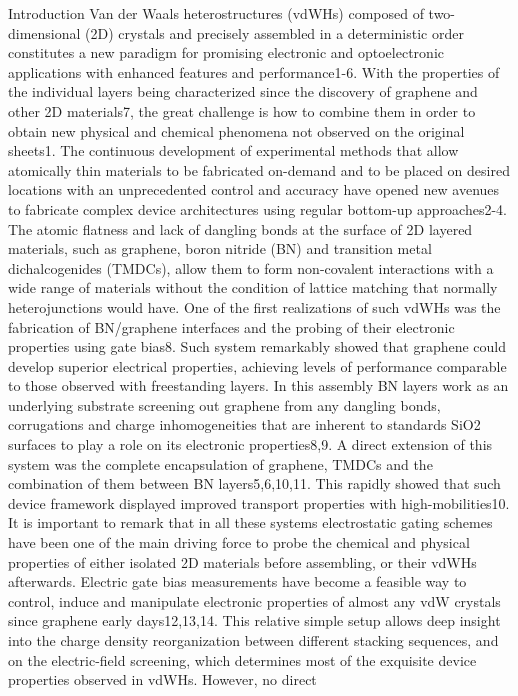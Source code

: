 Introduction Van der Waals heterostructures (vdWHs) composed of
two-dimensional (2D) crystals and precisely assembled in a
deterministic order constitutes a new paradigm for promising
electronic and optoelectronic applications with enhanced features and
performance1-6. With the properties of the individual layers being
characterized since the discovery of graphene and other 2D materials7,
the great challenge is how to combine them in order to obtain new
physical and chemical phenomena not observed on the original
sheets1. The continuous development of experimental methods that allow
atomically thin materials to be fabricated on-demand and to be placed
on desired locations with an unprecedented control and accuracy have
opened new avenues to fabricate complex device architectures using
regular bottom-up approaches2-4. The atomic flatness and lack of
dangling bonds at the surface of 2D layered materials, such as
graphene, boron nitride (BN) and transition metal dichalcogenides
(TMDCs), allow them to form non-covalent interactions with a wide
range of materials without the condition of lattice matching that
normally heterojunctions would have. One of the first realizations of
such vdWHs was the fabrication of BN/graphene interfaces and the
probing of their electronic properties using gate bias8. Such system
remarkably showed that graphene could develop superior electrical
properties, achieving levels of performance comparable to those
observed with freestanding layers. In this assembly BN layers work as
an underlying substrate screening out graphene from any dangling
bonds, corrugations and charge inhomogeneities that are inherent to
standards SiO2 surfaces to play a role on its electronic
properties8,9. A direct extension of this system was the complete
encapsulation of graphene, TMDCs and the combination of them between
BN layers5,6,10,11. This rapidly showed that such device framework
displayed improved transport properties with high-mobilities10. It is
important to remark that in all these systems electrostatic gating
schemes have been one of the main driving force to probe the chemical
and physical properties of either isolated 2D materials before
assembling, or their vdWHs afterwards. Electric gate bias measurements
have become a feasible way to control, induce and manipulate
electronic properties of almost any vdW crystals since graphene early
days12,13,14. This relative simple setup allows deep insight into the
charge density reorganization between different stacking sequences,
and on the electric-field screening, which determines most of the
exquisite device properties observed in vdWHs. However, no direct
